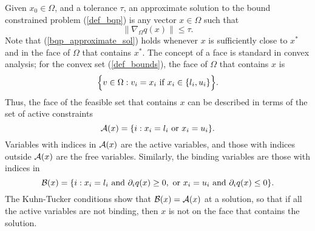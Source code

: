 Given $x_0 \in \Omega$, and a tolerance $\tau$, an
approximate solution to the bound constrained problem (\ref{def_bqp}) 
is any vector $x \in \Omega$ such
that
\begin{equation} 
\label{bqp_approximate_sol}
\| \nabla_{\Omega} q(x) \| \leq \tau . %
\end{equation}
Note that (\ref{bqp_approximate_sol}) holds whenever
$x$ is sufficiently close to $x^*$ and in the face of $\Omega $ that
contains $x^*$.  The concept of a face is standard in convex analysis;
for the convex set (\ref{def_bounds}), the face of $\Omega$ that contains
$x$ is
\[ 
\Bigl \{ v \in \Omega: v_i = x_i \mbox{ if } x_i \in \{ l_i, u_i \} \Bigr \}. 
\]
Thus, the face of the feasible set that contains $x$ can
be described in terms of the set of active constraints
\[ 
{\cal A}(x) = \{ i: x_i = l_i \mbox{ or } x_i = u_i \}. 
\]
Variables with indices in ${\cal A}(x)$ are the active variables,
and those with indices outside  ${\cal A}(x)$ are the free variables.
Similarly, the binding variables are those with indices in
\[ 
{\cal B}(x) = \{ i:x_i=l_i \mbox{ and } \partial_iq(x) \geq 0,
\mbox{ or } x_i=u_i \mbox{ and } \partial_iq(x) \leq 0 \}. 
\]
The Kuhn-Tucker conditions show that 
$ \cB (x) = \cA (x) $ at a solution, so that if all the active
variables are not binding, then $x$ is not on the face
that contains the solution.

